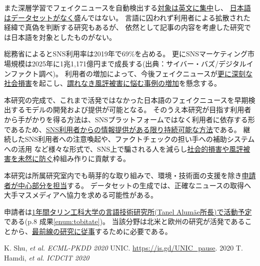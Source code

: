また深層学習でフェイクニュースを自動検出する\underline{対象は英文に集中}し、
\underline{日本語はデータセットがなく}盛んではない。
言語に囚われず利用者による拡散された経緯で真偽を判断する研究もあるが\cite{tarek2020}、
依然として記事の内容を考慮した研究では日本語を対象としたものがない。

総務省によるとSNS利用率は2019年で69\%を占める。
更にSNSマーケティング市場規模は2025年に1兆1,171億円まで成長する(出典：サイバー・バズ/デジタルインファクト調べ)。
利用者の増加によって、今後フェイクニュースが\underline{更に深刻な社会損害}を起こし、\underline{謂れなき風評被害に悩む事例の増加}を懸念する。

本研究の完成で、これまで活発ではなかった日本語のフェイクニュースを早期検出するモデルの開発および提供が可能となる。
そのうえ本研究が目指す利用者から手がかりを得る方法は、SNSプラットフォームではなく利用者に依存する形であるため、\underline{SNS利用者からの情報提供がある限り持続可能な方法}である。
継続したSNS利用者への注意喚起や、ファクトチェックの担い手への補助システムへの活用
など様々な形式で、SNS上で騙される人を減らし\underline{社会的損害や風評被害を未然に防ぐ}枠組み作りに貢献する。



本研究は所属研究室内でも萌芽的な取り組みで、環境・技術面の支援を除き\underline{申請者が中心部分を担当}する。
データセットの生成では、正確なニュースの取得へ大手マスメディアへ協力を求める可能性がある。

申請者は\underline{1年間タリン工科大学の言語技術研究所(Tanel Alumäe所長)で活動予定}である(p.8 成果\ref{enum:tobitate})。
当該分野は北米と欧州の研究が活発であることから、\underline{最前線の研究に従事}するために必要である。

\vspace{5mm}
{\footnotesize 
\begin{twobibliography}{99}
    \setlength{\parskip}{0cm}
    \setlength{\itemsep}{0cm}
    \setcounter{enumiv}{9}
     K. Shu, \textit{et al.} \textit{ECML-PKDD 2020}
     UNIC. \url{https://is.gd/UNIC_pause}. 2020
     T. Hamdi, \textit{et al.} \textit{ICDCIT 2020}
\end{twobibliography}
}


